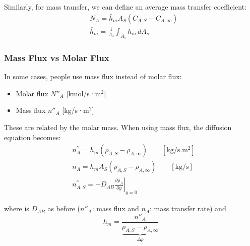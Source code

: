 Similarly, for mass transfer, we can define an average mass transfer coefficient:
\[
    \begin{aligned}
        & N_A=\bar{h}_m A_S\left(C_{A, S}-C_{A, \infty}\right)
        \\[1em]
        & \bar{h}_m = \frac{1}{A_s}\int_{A_s} h_m\,dA_s
    \end{aligned}
\]

\subsubsection*{Mass Flux vs Molar Flux}
In some cases, people use mass flux instead of molar flux:
\begin{itemize}
    \item Molar flux $N''_A$ [kmol/s·m$^2$] 
    \item Mass flux $n''_A$ [kg/s·m$^2$]
\end{itemize}

These are related by the molar mass. When using mass flux, the diffusion equation becomes:
\[
    \begin{aligned}
    & n_A^{\prime \prime}=h_m\left(\rho_{A, S}-\rho_{A, \infty}\right)\qquad \mathrm{[kg/s.m^2]}
    \\[1em]
    & n_A=h_m A_S\left(\rho_{A, S}-\rho_{A, \infty}\right)  \qquad \mathrm{[kg/s]}
    \\[1em]
    & n_{A, S}^{\prime \prime}=-\left.D_{A B} \frac{\partial \rho_A}{\partial y}\right|_{y=0}
    \end{aligned}
\]

where is $D_{AB}$ as before ($n''_{A}$: mass flux and $n_A$: mass transfer rate) and
\[
        h_m = \frac{n''_A}{\underbrace{\rho_{A, S}-\rho_{A, \infty}}_{\Delta \rho}}
\]
